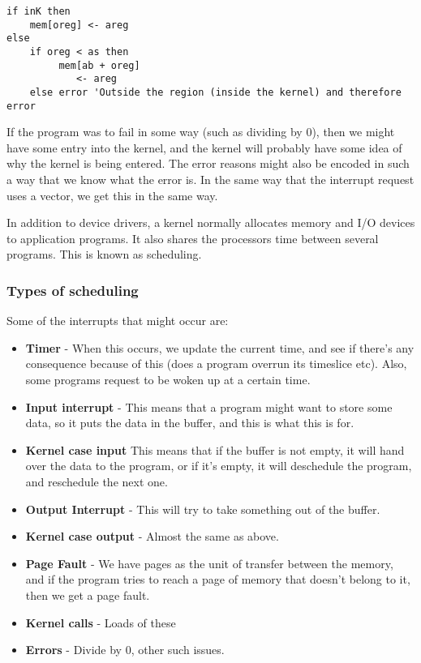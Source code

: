 \documentclass[11pt,a4paper,titlepage,dvipsnames,cmyk]{scrartcl}
\begin{document}
\begin{lstlisting}
if inK then
    mem[oreg] <- areg
else
    if oreg < as then
         mem[ab + oreg]
            <- areg
    else error 'Outside the region (inside the kernel) and therefore error
\end{lstlisting}

If the program was to fail in some way (such as dividing by 0), then we
might have some entry into the kernel, and the kernel will probably have
some idea of why the kernel is being entered. The error reasons might also
be encoded in such a way that we know what the error is. In the same way
that the interrupt request uses a vector, we get this in the same way.

In addition to device drivers, a kernel normally allocates memory and
I/O devices to application programs. It also shares the processors time
between several programs. This is known as scheduling.

\subsubsection{Types of scheduling}%
\label{ssub:types}

Some of the interrupts that might occur are:
\begin{itemize}
    \item \textbf{Timer} - When this occurs, we update the current time,
        and see if there's any consequence because of this (does a program
        overrun its timeslice etc). Also, some programs request to be
        woken up at a certain time.
    \item \textbf{Input interrupt} - This means that a program might want
        to store some data, so it puts the data in the buffer, and this is
        what this is for.
    \item \textbf{Kernel case input} This means that if the buffer is not
        empty, it will hand over the data to the program, or if it's
        empty, it will deschedule the program, and reschedule the next
        one.
    \item \textbf{Output Interrupt} - This will try to take something out
        of the buffer.
    \item \textbf{Kernel case output} - Almost the same as above.
    \item \textbf{Page Fault} - We have pages as the unit of transfer
        between the memory, and if the program tries to reach a page of
        memory that doesn't belong to it, then we get a page fault.
    \item \textbf{Kernel calls} - Loads of these
    \item \textbf{Errors} - Divide by 0, other such issues.
\end{itemize}
\end{document}
